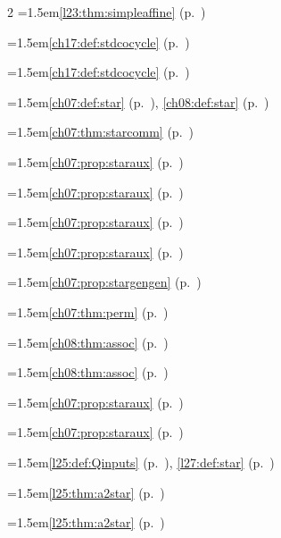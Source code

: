 \begin{multicols}{2}
\hangindent=1.5em\quad \ref{l23:thm:simpleaffine} (p.~\pageref{l23:thm:simpleaffine})\par
\hangindent=1.5em\quad \ref{ch17:def:stdcocycle} (p.~\pageref{ch17:def:stdcocycle})\par
\hangindent=1.5em\quad \ref{ch17:def:stdcocycle} (p.~\pageref{ch17:def:stdcocycle})\par
\hangindent=1.5em\quad \ref{ch07:def:star} (p.~\pageref{ch07:def:star}), \ref{ch08:def:star} (p.~\pageref{ch08:def:star})\par
\hangindent=1.5em\quad \ref{ch07:thm:starcomm} (p.~\pageref{ch07:thm:starcomm})\par
\hangindent=1.5em\quad \ref{ch07:prop:staraux} (p.~\pageref{ch07:prop:staraux})\par
\hangindent=1.5em\quad \ref{ch07:prop:staraux} (p.~\pageref{ch07:prop:staraux})\par
\hangindent=1.5em\quad \ref{ch07:prop:staraux} (p.~\pageref{ch07:prop:staraux})\par
\hangindent=1.5em\quad \ref{ch07:prop:staraux} (p.~\pageref{ch07:prop:staraux})\par
\hangindent=1.5em\quad \ref{ch07:prop:stargengen} (p.~\pageref{ch07:prop:stargengen})\par
\hangindent=1.5em\quad \ref{ch07:thm:perm} (p.~\pageref{ch07:thm:perm})\par
\hangindent=1.5em\quad \ref{ch08:thm:assoc} (p.~\pageref{ch08:thm:assoc})\par
\hangindent=1.5em\quad \ref{ch08:thm:assoc} (p.~\pageref{ch08:thm:assoc})\par
\hangindent=1.5em\quad \ref{ch07:prop:staraux} (p.~\pageref{ch07:prop:staraux})\par
\hangindent=1.5em\quad \ref{ch07:prop:staraux} (p.~\pageref{ch07:prop:staraux})\par
\hangindent=1.5em\quad \ref{l25:def:Qinputs} (p.~\pageref{l25:def:Qinputs}), \ref{l27:def:star} (p.~\pageref{l27:def:star})\par
\hangindent=1.5em\quad \ref{l25:thm:a2star} (p.~\pageref{l25:thm:a2star})\par
\hangindent=1.5em\quad \ref{l25:thm:a2star} (p.~\pageref{l25:thm:a2star})\par

\end{multicols}
